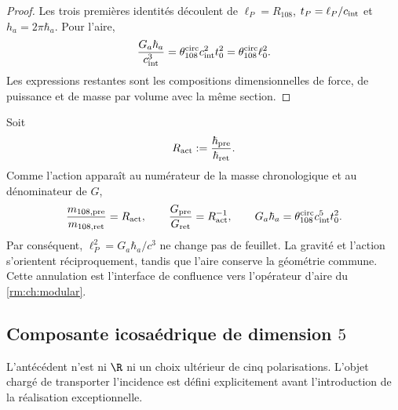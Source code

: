 \begin{proof}
Les trois premières identités découlent de
\(\ell_P=R_{108}\), \(t_P=\ell_P/c_{\rm int}\) et
\(h_a=2\pi\hbar_a\). Pour l'aire,
\[
\frac{G_a\hbar_a}{c_{\rm int}^3}
=\theta_{108}^{\rm circ}c_{\rm int}^2t_0^2
=\theta_{108}^{\rm circ}\ell_0^2.
\]
Les expressions restantes sont les compositions dimensionnelles de force,
de puissance et de masse par volume avec la même section.
\end{proof}

Soit
\begin{equation}
\label{rm:eq:gravity-Ract}
R_{\rm act}:=\frac{\hbar_{\rm pre}}{\hbar_{\rm ret}}.
\end{equation}
Comme l'action apparaît au numérateur de la masse chronologique et au
dénominateur de \(G\),
\begin{equation}
\label{rm:eq:gravity-twoway-covariance}
\frac{m_{108,\rm pre}}{m_{108,\rm ret}}=R_{\rm act},
\qquad
\frac{G_{\rm pre}}{G_{\rm ret}}=R_{\rm act}^{-1},
\qquad
G_a\hbar_a
=\theta_{108}^{\rm circ}c_{\rm int}^5t_0^2.
\end{equation}
Par conséquent, \(\ell_P^2=G_a\hbar_a/c^3\) ne change pas de feuillet. La gravité et
l'action s'orientent réciproquement, tandis que l'aire conserve la
géométrie commune. Cette annulation est l'interface de confluence vers l'opérateur
d'aire du \cref{rm:ch:modular}.

\subsection{Composante icosaédrique de dimension \(5\)}

L’antécédent n’est ni \(\R\) ni un choix ultérieur de cinq polarisations. L’objet chargé de transporter l’incidence est défini explicitement avant l’introduction de la réalisation exceptionnelle.

